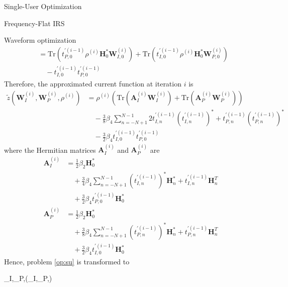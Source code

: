\documentclass{IEEEtran}
\begin{document}
\begin{section}{Single-User Optimization}
\begin{subsection}{Frequency-Flat IRS}
\begin{subsubsection}{Waveform optimization}
\begin{equation}
\begin{split}
					& = \mathrm{Tr}(t_{P,0}^{\prime (i-1)}\rho^{(i)}\boldsymbol{H}_{0}^*\boldsymbol{W}_{I,0}^{(i)}) + \mathrm{Tr}(t_{I,0}^{\prime (i-1)}\rho^{(i)}\boldsymbol{H}_{0}^*\boldsymbol{W}_{P,0}^{(i)})\\
					& \quad - t_{I,0}^{\prime (i-1)} t_{P,0}^{\prime (i-1)}
				\end{split}
			\end{equation}
			Therefore, the approximated current function at iteration $i$ is
			\begin{equation}\label{eq:z_waveform_approx}
				\begin{split}
					\tilde{z}(\boldsymbol{W}_I^{(i)},\boldsymbol{W}_P^{(i)},\rho^{(i)})
					& = \rho^{(i)}\left(\mathrm{Tr}(\boldsymbol{A}_I^{(i)}\boldsymbol{W}_I^{(i)}) + \mathrm{Tr}(\boldsymbol{A}_P^{(i)}\boldsymbol{W}_P^{(i)})\right)\\
					& \quad - \frac{3}{8} \beta_4 \sum_{n=-N+1}^{N-1} 2t_{I,n}^{\prime (i-1)} (t_{I,n}^{\prime (i-1)})^* + t_{P,n}^{\prime (i-1)} (t_{P,n}^{\prime (i-1)})^*\\
					& \quad - \frac{3}{2} \beta_4 t_{I,0}^{\prime (i-1)} t_{P,0}^{\prime (i-1)}
				\end{split}
			\end{equation}
			where the Hermitian matrices $\boldsymbol{A}_I^{(i)}$ and $\boldsymbol{A}_P^{(i)}$ are
			\begin{align}
				\boldsymbol{A}_I^{(i)}
				& = \frac{1}{2} \beta_2 \boldsymbol{H}_0^*\nonumber\\
				& \quad + \frac{3}{4} \beta_4 \sum_{n=-N+1}^{N-1} (t_{I,n}^{\prime (i-1)})^*\boldsymbol{H}_{n}^* + t_{I,n}^{\prime (i-1)}\boldsymbol{H}_{n}^T\nonumber\\
				& \quad + \frac{3}{2} \beta_4 t_{P,0}^{\prime (i-1)}\boldsymbol{H}_{0}^*\label{eq:A_I}\\
				\boldsymbol{A}_P^{(i)}
				& = \frac{1}{2} \beta_2 \boldsymbol{H}_0^*\nonumber\\
				& \quad + \frac{3}{8} \beta_4 \sum_{n=-N+1}^{N-1} (t_{P,n}^{\prime (i-1)})^*\boldsymbol{H}_{n}^* + t_{P,n}^{\prime (i-1)}\boldsymbol{H}_{n}^T\nonumber\\
				& \quad + \frac{3}{2} \beta_4 t_{I,0}^{\prime (i-1)}\boldsymbol{H}_{0}^*\label{eq:A_P}
			\end{align}
			Hence, problem \ref{op:su} is transformed to
			\begin{maxi!}
				{\boldsymbol{W}_I,_P,\rho}{(\boldsymbol{W}_I,_P,\rho)}{\label{op:su_waveform}}{\label{eq:su_waveform_target}}

\end{maxi!}
\end{subsubsection}
\end{subsection}
\end{section}
\end{document}
